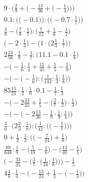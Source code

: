 \documentclass[8pt]{article}
\begin{document}
\begin{align}
9 \cdot \bigg(\frac{2}{9} + \Big(-\frac{13}{36} + \big(-\frac{1}{4}\big)\Big)\bigg) \\
0.1 : \Big(\big(-0.1\big)\Big) : \Big(\big(-0.7 \cdot \frac{1}{7}\big)\Big) \\
\frac{3}{8} - \big(\frac{7}{8} \cdot \frac{1}{7}\big) : \big(\frac{7}{12} + \frac{1}{6} - \frac{1}{2}\big) \\
\Big(-2 \cdot \frac{1}{3}\Big) - \Big(1 \cdot \big(2\frac{1}{3} \cdot \frac{1}{7}\big)\Big) \\
2\frac{23}{56} \cdot \frac{1}{9} - \frac{1}{7} : \big(11.1 - 0.1 \cdot \frac{1}{8}\big) \\
-\big(-\frac{1}{6} : \frac{1}{4} + \frac{11}{45} + \frac{1}{5} - \frac{1}{9}\big) \\
-\Big(-\big(-\frac{1}{6}\big) : \big(\frac{1}{144} : \frac{1}{3} : \frac{1}{8}\big)\Big) \\
85\frac{15}{21} \cdot \frac{1}{2} \cdot \frac{1}{9} \cdot 0.1 - \frac{1}{7} : \frac{1}{3} \\
-\Big(-2\frac{33}{35} + \frac{1}{5} - \big(\frac{2}{7} \cdot \frac{1}{2}\big) \cdot \frac{1}{3}\Big) \\
-\Big(-\big(-2\frac{13}{36} - \frac{1}{9} \cdot \frac{1}{9} : \frac{1}{4}\big)\Big) \\
\frac{3}{6} \cdot \bigg(2\frac{2}{3} \cdot \frac{1}{8}\bigg) : \bigg(\frac{1}{42} : \Big(\big(-\frac{1}{7}\big)\Big)\bigg) \\
0 + \frac{1}{2} \cdot \frac{1}{3} : \Big(\big(-\frac{7}{24}\big) + \frac{1}{8}\Big) \\
\frac{89}{648} : \frac{1}{9} - \big(\frac{5}{18} - \frac{1}{6}\big) - \big(\frac{13}{40} - \frac{1}{5}\big) \\
\bigg(-\frac{33}{35} - \Big(\frac{3}{7} \cdot \big(\frac{1}{24} : \frac{1}{8}\big)\Big)\bigg) - \frac{1}{5} \\
4\frac{4}{8} \cdot \frac{1}{4} - \Big(-\frac{13}{24} + \frac{1}{3} - \big(-\frac{1}{3}\big)\Big)
\end{align}
\end{document}
